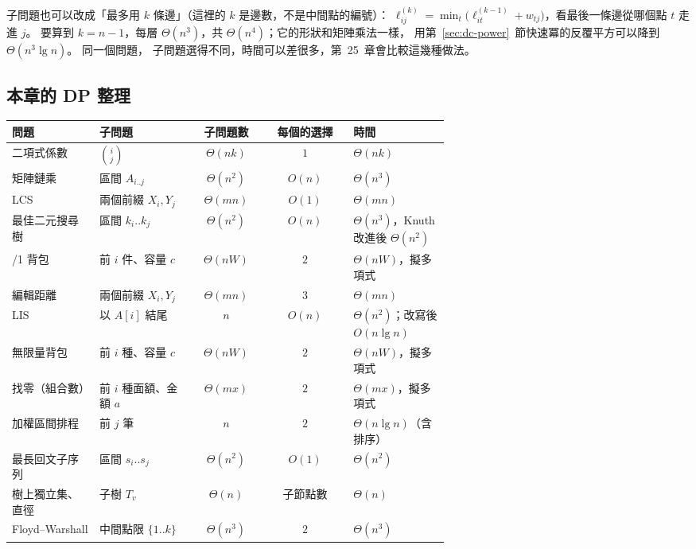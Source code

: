 子問題也可以改成「最多用 $k$ 條邊」（這裡的 $k$ 是邊數，不是中間點的編號）：
$\ell_{ij}^{(k)} = \min_{t} \bigl(\ell_{it}^{(k-1)} + w_{tj}\bigr)$，看最後一條邊從哪個點 $t$
走進 $j$。 要算到 $k = n - 1$，每層 $\Theta(n^3)$，共 $\Theta(n^4)$；它的形狀和矩陣乘法一樣，
用第~\ref{sec:dc-power}~節快速冪的反覆平方可以降到 $\Theta(n^3 \lg n)$。 同一個問題，
子問題選得不同，時間可以差很多，第~25~章會比較這幾種做法。

\subsection{本章的 DP 整理}

\begin{center}
\small
\begin{tabular}{>{\raggedright\arraybackslash}p{0.2\linewidth}>{\raggedright\arraybackslash}p{0.22\linewidth}cc>{\raggedright\arraybackslash}p{0.22\linewidth}}
\toprule
問題 & 子問題 & 子問題數 & 每個的選擇 & 時間 \\
\midrule
二項式係數 & $\binom{i}{j}$ & $\Theta(nk)$ & $1$ & $\Theta(nk)$ \\
矩陣鏈乘 & 區間 $A_{i..j}$ & $\Theta(n^2)$ & $O(n)$ & $\Theta(n^3)$ \\
LCS & 兩個前綴 $X_i, Y_j$ & $\Theta(mn)$ & $O(1)$ & $\Theta(mn)$ \\
最佳二元搜尋樹 & 區間 $k_i..k_j$ & $\Theta(n^2)$ & $O(n)$ & $\Theta(n^3)$，Knuth 改進後 $\Theta(n^2)$ \\
0/1 背包 & 前 $i$ 件、容量 $c$ & $\Theta(nW)$ & $2$ & $\Theta(nW)$，擬多項式 \\
編輯距離 & 兩個前綴 $X_i, Y_j$ & $\Theta(mn)$ & $3$ & $\Theta(mn)$ \\
LIS & 以 $A[i]$ 結尾 & $n$ & $O(n)$ & $\Theta(n^2)$；改寫後 $O(n \lg n)$ \\
無限量背包 & 前 $i$ 種、容量 $c$ & $\Theta(nW)$ & $2$ & $\Theta(nW)$，擬多項式 \\
找零（組合數） & 前 $i$ 種面額、金額 $a$ & $\Theta(mx)$ & $2$ & $\Theta(mx)$，擬多項式 \\
加權區間排程 & 前 $j$ 筆 & $n$ & $2$ & $\Theta(n \lg n)$（含排序） \\
最長回文子序列 & 區間 $s_i..s_j$ & $\Theta(n^2)$ & $O(1)$ & $\Theta(n^2)$ \\
樹上獨立集、直徑 & 子樹 $T_v$ & $\Theta(n)$ & 子節點數 & $\Theta(n)$ \\
Floyd--Warshall & 中間點限 $\{1..k\}$ & $\Theta(n^3)$ & $2$ & $\Theta(n^3)$ \\
\bottomrule
\end{tabular}
\end{center}


